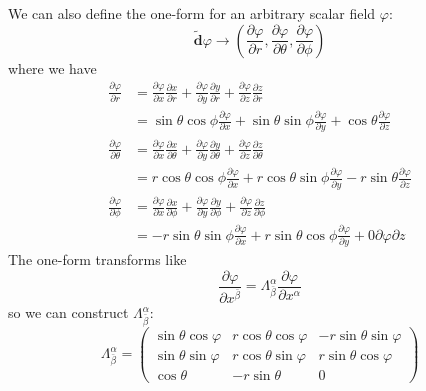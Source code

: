\documentclass[11pt]{article}
\numberwithin{equation}{section}
\numberwithin{figure}{section}
\numberwithin{table}{section}
\begin{document}
We can also define the one-form for an arbitrary scalar field $\varphi$:
\begin{equation}
    \tilde{\textbf{d}}\varphi\rightarrow\left(\frac{\partial\varphi}{\partial r},\frac{\partial\varphi}{\partial\theta},\frac{\partial\varphi}{\partial\phi}\right)
    \label{eqn:scalar one-form}
\end{equation}
where we have 
\begin{align*}
    \frac{\partial \varphi}{\partial r}&=\frac{\partial\varphi}{\partial x}\frac{\partial x}{\partial r}+\frac{\partial\varphi}{\partial y}\frac{\partial y}{\partial r}+\frac{\partial\varphi}{\partial z}\frac{\partial z}{\partial r}\\
    &=\sin\theta\cos\phi\frac{\partial\varphi}{\partial x}+\sin\theta\sin\phi\frac{\partial\varphi}{\partial y}+\cos\theta\frac{\partial\varphi}{\partial z}\\
    \frac{\partial \varphi}{\partial \theta}&=\frac{\partial\varphi}{\partial x}\frac{\partial x}{\partial \theta}+\frac{\partial\varphi}{\partial y}\frac{\partial y}{\partial \theta}+\frac{\partial\varphi}{\partial z}\frac{\partial z}{\partial \theta}\\
    &=r\cos\theta\cos\phi\frac{\partial\varphi}{\partial x}+r\cos\theta\sin\phi\frac{\partial\varphi}{\partial y}-r\sin\theta\frac{\partial\varphi}{\partial z}\\
    \frac{\partial \varphi}{\partial \phi}&=\frac{\partial\varphi}{\partial x}\frac{\partial x}{\partial \phi}+\frac{\partial\varphi}{\partial y}\frac{\partial y}{\partial \phi}+\frac{\partial\varphi}{\partial z}\frac{\partial z}{\partial \phi}\\
    &=-r\sin\theta\sin\phi\frac{\partial\varphi}{\partial x}+r\sin\theta\cos\phi\frac{\partial\varphi}{\partial y}+0{\partial\varphi}{\partial z}
\end{align*}
The one-form transforms like 
\begin{equation*}
    \frac{\partial\varphi}{\partial x^{\bar\beta}}=\Lambda_{\bar\beta}^\alpha\frac{\partial\varphi}{\partial x^\alpha}
\end{equation*}
so we can construct $\Lambda_{\bar\beta}^\alpha$:
\begin{equation}
    \Lambda_{\bar\beta}^\alpha=
    \begin{pmatrix}
        \sin\theta\cos\varphi&r\cos\theta\cos\varphi&-r\sin\theta\sin\varphi\\
        \sin\theta\sin\varphi&r\cos\theta\sin\varphi&r\sin\theta\cos\varphi\\
        \cos\theta&-r\sin\theta&0
    \end{pmatrix}
\end{equation}
\end{document}
